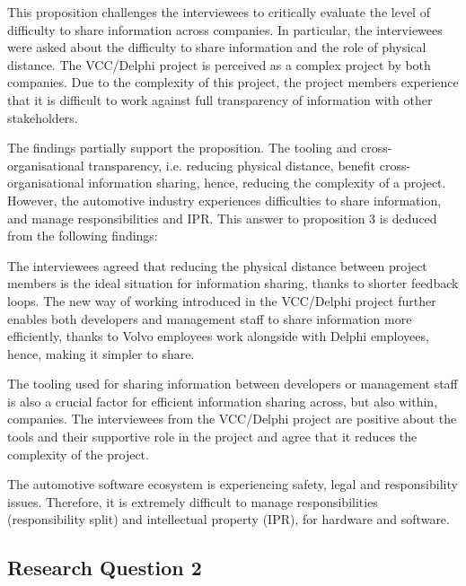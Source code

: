 This proposition challenges the interviewees to critically evaluate the level of difficulty to share information across companies. In particular, the interviewees were asked about the difficulty to share information and the role of physical distance. The VCC/Delphi project is perceived as a complex project by both companies. Due to the complexity of this project, the project members experience that it is difficult to work against full transparency of information with other stakeholders. 

The findings partially support the proposition. The tooling and cross-organisational transparency, i.e. reducing physical distance, benefit cross-organisational information sharing, hence, reducing the complexity of a project. However, the automotive industry experiences difficulties to share information, and manage responsibilities and IPR. This answer to proposition 3 is deduced from the following findings:

 The interviewees agreed that reducing the physical distance between project members is the ideal situation for information sharing, thanks to shorter feedback loops. The new way of working introduced in the VCC/Delphi project further enables both developers and management staff to share information more efficiently, thanks to Volvo employees work alongside with Delphi employees, hence, making it simpler to share. 

 The tooling used for sharing information between developers or management staff is also a crucial factor for efficient information sharing across, but also within, companies. The interviewees from the VCC/Delphi project are positive about the tools and their supportive role in the project and agree that it reduces the complexity of the project.

 The automotive software ecosystem is experiencing safety, legal and responsibility issues. Therefore, it is extremely difficult to manage responsibilities (responsibility split) and intellectual property (IPR), for hardware and software. %

\subsection{Research Question 2}\label{sec:ResearchQuestion2}

